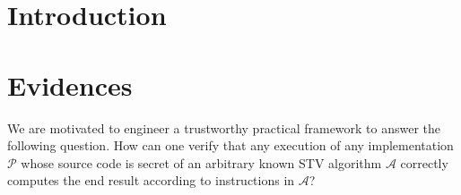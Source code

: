 \documentclass[10pt,conference]{IEEEtran}
\begin{document}
\begin{IEEEkeywords}

\end{IEEEkeywords}
\section{Introduction}\label{sec:intro}
\section{Evidences}
\label{sec:DataEv}

We are motivated to engineer a trustworthy practical  framework to answer the following question. How can one verify that any execution of any implementation $\mathcal{P}$ whose source code is secret of an arbitrary  known STV algorithm $\mathcal{A}$ correctly computes the end result according to instructions in $\mathcal{A}$?  
\end{document}
